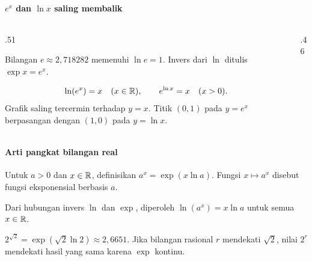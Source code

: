 \documentclass{../../kalkulus-ppt}
\begin{document}
\begin{frame}{\insertsection}
    \framesubtitle{$e^x$ dan $\ln x$ saling membalik}
    \begin{columns}[c,onlytextwidth]
        \begin{column}{.51\textwidth}
            \begin{definisi}
                Bilangan $e\approx2{,}718282$ memenuhi $\ln e=1$.
                Invers dari $\ln$ ditulis $\exp x=e^x$.
            \end{definisi}
            \[
                \ln(e^x)=x\quad(x\in\mathbb{R}),\qquad
                e^{\ln x}=x\quad(x>0).
            \]
            Grafik saling tercermin terhadap $y=x$. Titik $(0,1)$ pada $y=e^x$
            berpasangan dengan $(1,0)$ pada $y=\ln x$.
        \end{column}
        \begin{column}{.46\textwidth}
            \centering
        \end{column}
    \end{columns}
\end{frame}

\begin{frame}{\insertsection}
    \framesubtitle{Arti pangkat bilangan real}
    \begin{definisi}
        Untuk $a>0$ dan $x\in\mathbb{R}$, definisikan $a^x=\exp(x\ln a)$.
        Fungsi $x\mapsto a^x$ disebut fungsi eksponensial berbasis $a$.
    \end{definisi}
    \begin{teorema}
        Dari hubungan invers $\ln$ dan $\exp$, diperoleh
        $\ln(a^x)=x\ln a$ untuk semua $x\in\mathbb{R}$.
    \end{teorema}
    \begin{contoh}
        $\displaystyle 2^{\sqrt 2}=\exp(\sqrt 2\ln 2)\approx2{,}6651$.
        Jika bilangan rasional $r$ mendekati $\sqrt 2$, nilai $2^r$ mendekati
        hasil yang sama karena $\exp$ kontinu.
    \end{contoh}
\end{frame}
\end{document}
